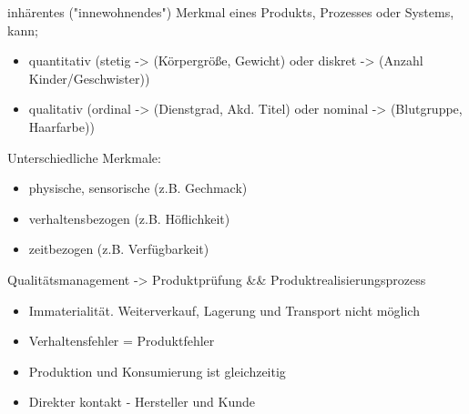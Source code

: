 \documentclass[12pt]{article}
\begin{document}
\begin{note}
\end{note}

\begin{note}
    \begin{field}
        inhärentes ("innewohnendes") Merkmal eines Produkts, Prozesses oder Systems, kann;
        \begin{itemize}
            \item quantitativ (stetig -> (Körpergröße, Gewicht) oder diskret -> (Anzahl Kinder/Geschwister))
            \item qualitativ (ordinal -> (Dienstgrad, Akd. Titel) oder nominal -> (Blutgruppe, Haarfarbe))
        \end{itemize}
        Unterschiedliche Merkmale:
        \begin{itemize}
            \item physische, sensorische (z.B. Gechmack)
            \item verhaltensbezogen (z.B. Höflichkeit)
            \item zeitbezogen (z.B. Verfügbarkeit)
        \end{itemize}
        Qualitätsmanagement -> Produktprüfung && Produktrealisierungsprozess
    \end{field}
\end{note}

\begin{note}
\end{note}

\begin{note}
    \begin{field}
        \begin{itemize}
            \item Immaterialität. Weiterverkauf, Lagerung und Transport nicht möglich
            \item Verhaltensfehler = Produktfehler
            \item Produktion und Konsumierung ist gleichzeitig
            \item Direkter kontakt - Hersteller und Kunde
        \end{itemize}
    \end{field}
\end{note}
\end{document}
